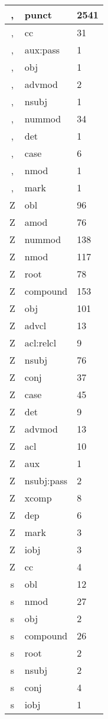 \documentclass[a4 paper]{article}
\begin{document}
\begin{longtable}{cp{}p{}}
, & punct & 2541\\ \midrule , & cc & 31\\ \midrule , & aux:pass & 1\\ \midrule , & obj & 1\\ \midrule , & advmod & 2\\ \midrule , & nsubj & 1\\ \midrule , & nummod & 34\\ \midrule , & det & 1\\ \midrule , & case & 6\\ \midrule , & nmod & 1\\ \midrule , & mark & 1\\ \midrule 
Z & obl & 96\\ \midrule Z & amod & 76\\ \midrule Z & nummod & 138\\ \midrule Z & nmod & 117\\ \midrule Z & root & 78\\ \midrule Z & compound & 153\\ \midrule Z & obj & 101\\ \midrule Z & advcl & 13\\ \midrule Z & acl:relcl & 9\\ \midrule Z & nsubj & 76\\ \midrule Z & conj & 37\\ \midrule Z & case & 45\\ \midrule Z & det & 9\\ \midrule Z & advmod & 13\\ \midrule Z & acl & 10\\ \midrule Z & aux & 1\\ \midrule Z & nsubj:pass & 2\\ \midrule Z & xcomp & 8\\ \midrule Z & dep & 6\\ \midrule Z & mark & 3\\ \midrule Z & iobj & 3\\ \midrule Z & cc & 4\\ \midrule 
s & obl & 12\\ \midrule s & nmod & 27\\ \midrule s & obj & 2\\ \midrule s & compound & 26\\ \midrule s & root & 2\\ \midrule s & nsubj & 2\\ \midrule s & conj & 4\\ \midrule s & iobj & 1\\ \midrule 

\end{longtable}
\end{document}
